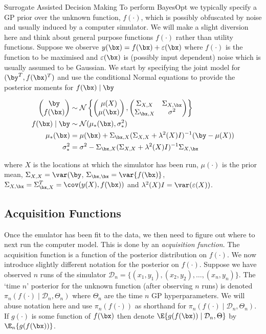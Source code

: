 \begin{chapter}{Surrogate Assisted Decision Making \label{Chap:optimisation}}
To perform BayesOpt we typically specify a GP prior over the unknown function, $f(\cdot)$, which is possibly obfuscated by noise and usually induced by a computer simulator. We will make a slight diversion here and think about general purpose functions $f(\cdot)$ rather than utility functions. Suppose we observe $y(\bx) = f(\bx) + \varepsilon(\bx)$ where $f(\cdot)$ is the function to be maximised and $\varepsilon(\bx)$ is (possibly input dependent) noise which is usually assumed to be Gaussian. We start by specifying the joint model for $(\by^T, f(\bx)^T)$ and use the conditional Normal equations to provide the posterior moments for $f(\bx) \mid \by$


\begin{align}
  \begin{pmatrix} \by \\ f(\bx) \end{pmatrix}
    &\sim \mathcal{N} \left\{
    \begin{pmatrix} \mu(X) \\ \mu(\bx) \end{pmatrix}, \begin{pmatrix} \Sigma_{X, X} & \Sigma_{X, \bx} \\ \Sigma_{\bx, X} & \sigma^2 \end{pmatrix}
    \right\} \\
    f(\bx) \mid \by &\sim \mathcal{N}(\mu_{*}(\bx), \sigma^2_* ) \\
    \mu_*(\bx) & = \mu(\bx) + \Sigma_{\bx, X}(\Sigma_{X, X}+\lambda^2(X)I)^{-1}(\by - \mu(X))\\
    \sigma^2_* &= \sigma^2 - \Sigma_{\bx, X}(\Sigma_{X, X}+\lambda^2(X)I)^{-1}\Sigma_{X, \bx}
\end{align}

where $X$ is the locations at which the simulator has been run, $\mu(\cdot)$ is the prior mean, $\Sigma_{X, X} = \var(\by$, $\Sigma_{\bx, \bx} = \var\{f(\bx)\}$, $\Sigma_{X, \bx} = \Sigma_{\bx, X}^T = \cov(y(X), f(\bx))$ and $\lambda^2(X)I = \var(\varepsilon(X))$.

\subsection{Acquisition Functions}

Once the emulator has been fit to the data, we then need to figure out where to next run the computer model. This is done by an \textit{acquisition function}. The acquisition function is a function of the posterior distribution on $f(\cdot)$. We now introduce slightly different notation for the posterior on $f(\cdot)$. Suppose we have observed $n$ runs of the simulator $\mathcal{D}_n = \{(x_1, y_1), (x_2, y_2), \ldots, (x_n, y_n)\}$. The `time $n$' posterior for the unknown function (after observing $n$ runs) is denoted $\pi_n(f(\cdot) \mid \mathcal{D}_n, \Theta_n)$ where $\Theta_n$ are the time $n$ GP hyperparameters. We will abuse notation here and use $\pi_n(f(\cdot))$ as shorthand for $\pi_n(f(\cdot) \mid \mathcal{D}_n, \Theta_n)$.  If $g(\cdot)$ is some function of $f(\bx)$ then denote $\E\{g(f(\bx)) \mid \mathcal{D}_n, \Theta \}$ by $\E_n \{ g(f(\bx)) \}$.


\end{chapter}
